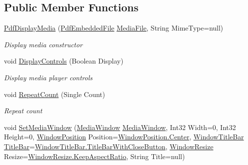 \subsection*{Public Member Functions}
\begin{DoxyCompactItemize}
\item 
\hyperlink{class_pdf_file_writer_1_1_pdf_display_media_a4b5ef3b4fcb9bc9fc36e64f89876aafc}{Pdf\+Display\+Media} (\hyperlink{class_pdf_file_writer_1_1_pdf_embedded_file}{Pdf\+Embedded\+File} \hyperlink{class_pdf_file_writer_1_1_pdf_display_media_add8c8947af649debff781cbc6625eb7c}{Media\+File}, String Mime\+Type=null)
\begin{DoxyCompactList}\small\item\em Display media constructor \end{DoxyCompactList}\item 
void \hyperlink{class_pdf_file_writer_1_1_pdf_display_media_ac6154fbe8e2fdfaf0384487671bd45f4}{Display\+Controls} (Boolean Display)
\begin{DoxyCompactList}\small\item\em Display media player controls \end{DoxyCompactList}\item 
void \hyperlink{class_pdf_file_writer_1_1_pdf_display_media_a7fbff3e6237299b6d3367d4ef298b918}{Repeat\+Count} (Single Count)
\begin{DoxyCompactList}\small\item\em Repeat count \end{DoxyCompactList}\item 
void \hyperlink{class_pdf_file_writer_1_1_pdf_display_media_a0060499c197af709de011fd6fb102b83}{Set\+Media\+Window} (\hyperlink{namespace_pdf_file_writer_a653ef272c573dc41330054386c178f69}{Media\+Window} \hyperlink{namespace_pdf_file_writer_a653ef272c573dc41330054386c178f69}{Media\+Window}, Int32 Width=0, Int32 Height=0, \hyperlink{namespace_pdf_file_writer_a096e8344234e0e62db8e6ce21ef3c41d}{Window\+Position} Position=\hyperlink{namespace_pdf_file_writer_a3991bfacc8c7be240452dd24ec817157a4f1f6016fc9f3f2353c0cc7c67b292bd}{Window\+Position.\+Center}, \hyperlink{namespace_pdf_file_writer_a61733ec2bbd267bda46a3781cb5f0f09}{Window\+Title\+Bar} \hyperlink{namespace_pdf_file_writer_a61733ec2bbd267bda46a3781cb5f0f09a8db484cb34af98d41a63c3f9f8350666}{Title\+Bar}=\hyperlink{namespace_pdf_file_writer_a61733ec2bbd267bda46a3781cb5f0f09a1a592329468d08ceb7df202b5b07be47}{Window\+Title\+Bar.\+Title\+Bar\+With\+Close\+Button}, \hyperlink{namespace_pdf_file_writer_ad205ccc8e28ac3421bff44c8f010ccf4}{Window\+Resize} Resize=\hyperlink{namespace_pdf_file_writer_ad205ccc8e28ac3421bff44c8f010ccf4ad5918ff91d32f152571819a564c0bdf2}{Window\+Resize.\+Keep\+Aspect\+Ratio}, String Title=null)

\end{DoxyCompactItemize}
